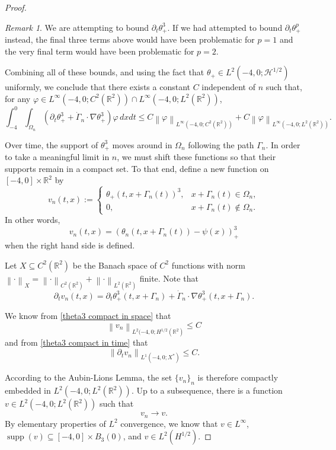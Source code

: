 \documentclass[11pt]{amsart}
\theoremstyle{remark}
\newtheorem*{remark}{Remark}
\theoremstyle{definition}
\newcommand{\R}{\mathbb{R}}
\newcommand{\norm}[1]{\left\lVert#1\right\rVert}
\newcommand{\paren}[1]{\left( #1 \right)}
\DeclareMathOperator{\supp}{supp}
\newcommand{\del}{\partial}
\newcommand{\grad}{\nabla}
\newcommand{\HD}{\mathcal{H}}
\begin{document}
\begin{proof}
\begin{itemize}
\end{itemize}

\begin{remark}
We are attempting to bound $\del_t \theta_+^3$.  If we had attempted to bound $\del_t \theta_+^p$ instead, the final three terms above would have been problematic for $p=1$ and the very final term would have been problematic for $p=2$.  
\end{remark}

Combining all of these bounds, and using the fact that $\theta_+ \in L^2(-4,0; \HD^{1/2})$ uniformly, we conclude that there exists a constant $C$ independent of $n$ such that, for any $\varphi \in L^\infty(-4,0; C^2(\R^2)) \cap L^\infty(-4,0; L^2(\R^2))$, 
\begin{equation} \label{theta3 compact in time} \int_{-4}^0 \int_{\Omega_n} \paren{ \del_t \theta_+^3 + \dot{\Gamma}_n \cdot \grad \theta_+^3 } \varphi \,dxdt \leq C \norm{\varphi}_{L^\infty(-4,0; C^2(\R^2))} + C \norm{\varphi}_{L^\infty(-4,0; L^2(\R^2))}. \end{equation}

Over time, the support of $\theta_+^3$ moves around in $\Omega_n$ following the path $\Gamma_n$.  In order to take a meaningful limit in $n$, we must shift these functions so that their supports remain in a compact set.  To that end, define a new function on $[-4,0] \times \R^2$ by
\[ v_n(t,x) := \begin{cases}
\theta_+(t, x + \Gamma_n(t))^3, & x + \Gamma_n(t) \in \Omega_n, \\
0, & x + \Gamma_n(t) \notin \Omega_n.
\end{cases} \]
In other words,
\begin{equation} \label{definition of v_n} v_n(t,x) = \paren{\theta_n(t, x + \Gamma_n(t)) - \psi(x)}_+^3 \end{equation}
when the right hand side is defined.

Let $X \subseteq C^2(\R^2)$ be the Banach space of $C^2$ functions with norm $\norm{\cdot}_X = \norm{\cdot}_{C^2(\R^2)} + \norm{\cdot}_{L^2(\R^2)}$ finite.  Note that
\[ \del_t v_n(t,x) = \del_t \theta_+^3(t,x+\Gamma_n) + \dot{\Gamma}_n \cdot \grad \theta_+^3(t,x+\Gamma_n). \]

We know from \eqref{theta3 compact in space} that
\[ \norm{ v_n }_{L^2(-4,0; H^{1/2}(\R^2)} \leq C \]
and from \eqref{theta3 compact in time} that
\[ \norm{ \del_t v_n }_{L^1(-4,0; X^*)} \leq C. \]

According to the Aubin-Lions Lemma, the set $\{v_n\}_n$ is therefore compactly embedded in $L^2(-4,0; L^2(\R^2))$.  Up to a subsequence, there is a function $v \in L^2(-4,0; L^2(\R^2))$ such that
\[ v_n \to v. \]
By elementary properties of $L^2$ convergence, we know that $v \in L^\infty$, $\supp(v) \subseteq [-4,0]\times B_3(0)$, and $v \in L^2(H^{1/2})$.  


\end{proof}
\end{document}
